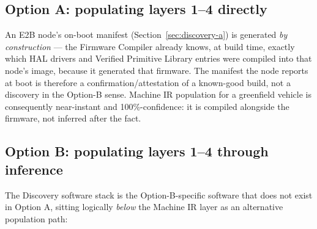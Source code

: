 \subsection{Option A: populating layers 1--4 directly}

An E2B node's on-boot manifest (Section~\ref{sec:discovery-a}) is generated \emph{by construction} --- the Firmware Compiler already knows, at build time, exactly which HAL drivers and Verified Primitive Library entries were compiled into that node's image, because it generated that firmware. The manifest the node reports at boot is therefore a confirmation/attestation of a known-good build, not a discovery in the Option-B sense. Machine IR population for a greenfield vehicle is consequently near-instant and 100\%-confidence: it is compiled alongside the firmware, not inferred after the fact.

\subsection{Option B: populating layers 1--4 through inference}

The Discovery software stack is the Option-B-specific software that does not exist in Option A, sitting logically \emph{below} the Machine IR layer as an alternative population path:

